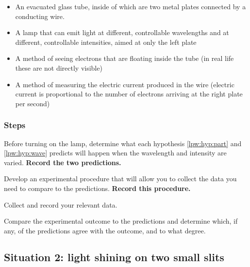 \begin{itemize}
	\item An evacuated glass tube, inside of which are two metal plates connected by a conducting wire.
	
	\item A lamp that can emit light at different, controllable wavelengths and at different, controllable intensities, aimed at only the left plate
	
	\item A method of seeing electrons that are floating inside the tube (in real life these are not directly visible)
	
	\item A method of measuring the electric current produced in the wire (electric current is proportional to the number of electrons arriving at the right plate per second)
\end{itemize}

\subsubsection{Steps}

\begin{steps}
	
	\item Before turning on the lamp, determine what each hypothesis \ref{lpw:hyp:part} and \ref{lpw:hyp:wave} predicts will happen when the wavelength and intensity are varied. \textbf{Record the two predictions.}
	
	\item Develop an experimental procedure that will allow you to collect the data you need to compare to the predictions. \textbf{Record this procedure.}
	
	\item Collect and record your relevant data.
	
	\item Compare the experimental outcome to the predictions and determine which, if any, of the predictions agree with the outcome, and to what degree.
\end{steps}


\subsection{Situation 2: light shining on two small slits}


